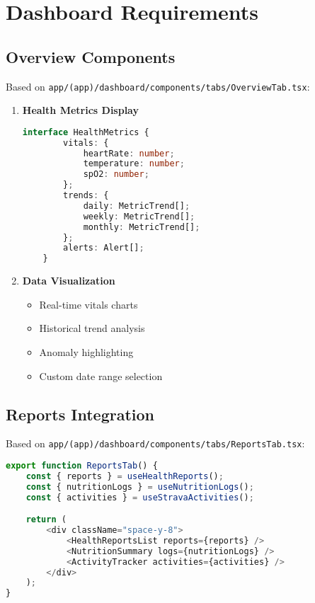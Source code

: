 \section{Dashboard Requirements}
\subsection{Overview Components}
Based on \texttt{app/(app)/dashboard/components/tabs/OverviewTab.tsx}:

\begin{enumerate}
    \item \textbf{Health Metrics Display}
    \begin{lstlisting}[language=typescript]
    interface HealthMetrics {
        vitals: {
            heartRate: number;
            temperature: number;
            spO2: number;
        };
        trends: {
            daily: MetricTrend[];
            weekly: MetricTrend[];
            monthly: MetricTrend[];
        };
        alerts: Alert[];
    }
    \end{lstlisting}

    \item \textbf{Data Visualization}
    \begin{itemize}
        \item Real-time vitals charts
        \item Historical trend analysis
        \item Anomaly highlighting
        \item Custom date range selection
    \end{itemize}
\end{enumerate}

\subsection{Reports Integration}
Based on \texttt{app/(app)/dashboard/components/tabs/ReportsTab.tsx}:

\begin{lstlisting}[language=typescript]
export function ReportsTab() {
    const { reports } = useHealthReports();
    const { nutritionLogs } = useNutritionLogs();
    const { activities } = useStravaActivities();

    return (
        <div className="space-y-8">
            <HealthReportsList reports={reports} />
            <NutritionSummary logs={nutritionLogs} />
            <ActivityTracker activities={activities} />
        </div>
    );
}
\end{lstlisting} 